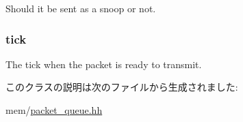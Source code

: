 Should it be sent as a snoop or not. \hypertarget{classPacketQueue_1_1DeferredPacket_a4daae57fbf09ee5423d123f5ce330e92}{
\subsubsection[{tick}]{ {\bf tick}}}
\label{classPacketQueue_1_1DeferredPacket_a4daae57fbf09ee5423d123f5ce330e92}


The tick when the packet is ready to transmit. 

このクラスの説明は次のファイルから生成されました:\begin{DoxyCompactItemize}
\item 
mem/\hyperlink{packet__queue_8hh}{packet\_\-queue.hh}\end{DoxyCompactItemize}
